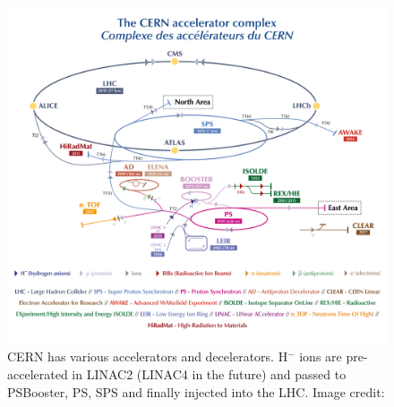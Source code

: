 \begin{figure}[h]
    \centering
    \includegraphics[width=\textwidth]{CCC-v2019-final-white_small}
    \caption{CERN has various accelerators and decelerators. H$^-$ ions are pre-accelerated
    in LINAC2 (LINAC4 in the future) and passed to PSBooster, PS, SPS and finally injected into
    the LHC. Image credit: \cite{CERN_AccCmplx}}
    \label{fig_cern_acc_cmplx}
\end{figure}
